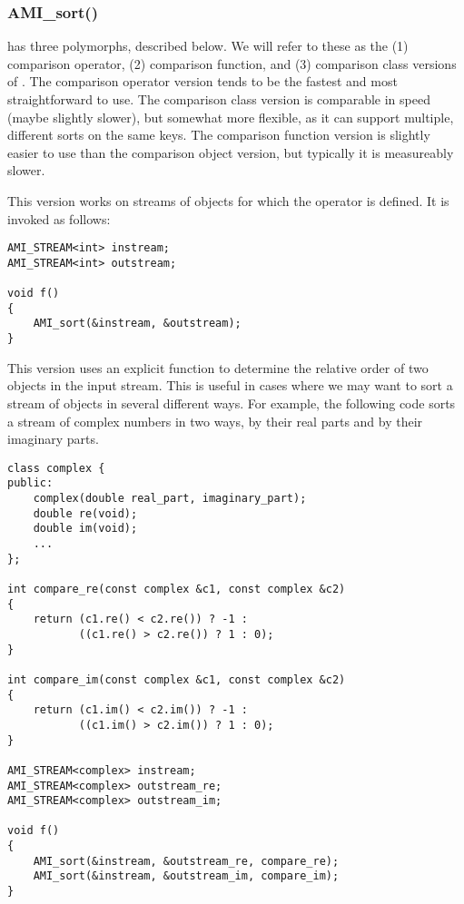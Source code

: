 \subsubsection{AMI\_sort()}
 has three polymorphs, described below.
We will refer to these as the (1) comparison operator, (2)
comparison function, and (3) comparison class versions of
. The comparison operator version tends to
be the fastest and most straightforward to use. The
comparison class version is comparable in speed (maybe
slightly slower), but somewhat more flexible, as it can support
multiple, different sorts on the same keys. The comparison
function version is slightly easier to use than the
comparison object version, but typically it is measureably slower.

 This version works on streams of
objects for which the operator \myverb{<} is defined. It is invoked as
follows:

\begin{verbatim}
AMI_STREAM<int> instream;
AMI_STREAM<int> outstream;

void f()
{
    AMI_sort(&instream, &outstream);
}
\end{verbatim}

This version uses an explicit function to
determine the relative order of two objects in the input stream.  This
is useful in cases where we may want to sort a stream of objects in
several different ways.  For example, the following code sorts a
stream of complex numbers in two ways, by their real parts and by
their imaginary parts.

\begin{verbatim}
class complex {
public:
    complex(double real_part, imaginary_part);
    double re(void);
    double im(void);
    ...
};

int compare_re(const complex &c1, const complex &c2)
{
    return (c1.re() < c2.re()) ? -1 :
           ((c1.re() > c2.re()) ? 1 : 0);
}

int compare_im(const complex &c1, const complex &c2)
{
    return (c1.im() < c2.im()) ? -1 :
           ((c1.im() > c2.im()) ? 1 : 0);
}

AMI_STREAM<complex> instream;
AMI_STREAM<complex> outstream_re;
AMI_STREAM<complex> outstream_im;

void f()
{
    AMI_sort(&instream, &outstream_re, compare_re);
    AMI_sort(&instream, &outstream_im, compare_im);
}
\end{verbatim}

